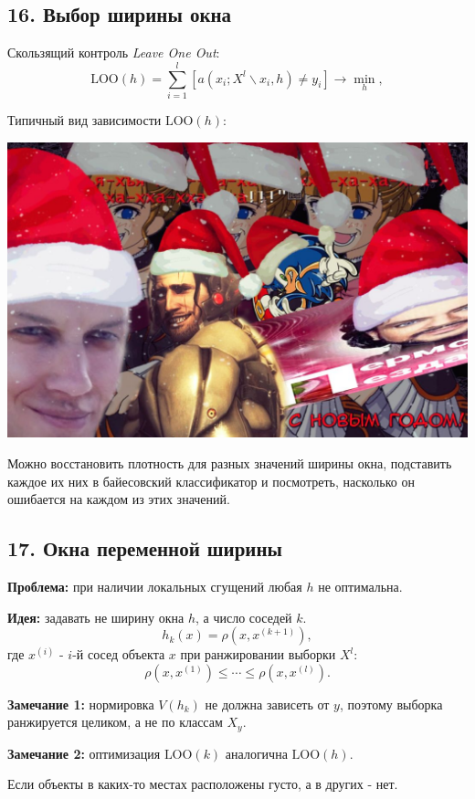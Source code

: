 \subsection{16. Выбор ширины окна}

Скользящий контроль \textit{Leave One Out}:
$$\text{LOO}{(h)} = \sum_{i=1}^{l}{\left[ a{(x_i; X^l \backslash x_i, h)} \neq y_i \right]} \rightarrow \min_{h},$$

Типичный вид зависимости $\text{LOO}{(h)}$:

\includegraphics[scale=0.3]{figures/samplefigure.jpg}

Можно восстановить плотность для разных значений ширины окна, подставить
каждое их них в байесовский классификатор и посмотреть, насколько он
ошибается на каждом из этих значений.

\subsection{17. Окна переменной ширины}

\textbf{Проблема:} при наличии локальных сгущений любая $h$ не оптимальна.

\textbf{Идея:} задавать не ширину окна $h$, а число соседей $k$.
$$h_k{(x)} = \rho{(x, x^{(k+1)})},$$
где $x^{(i)}$ - $i$-й сосед объекта $x$ при ранжировании выборки $X^l$:
$$\rho{(x, x^{(1)}) \leqslant \cdots \leqslant \rho{(x, x^{(l)})}.}$$

\textbf{Замечание 1:} нормировка $V{(h_k)}$ не должна зависеть от $y$, поэтому
выборка ранжируется целиком, а не по классам $X_y$.

\textbf{Замечание 2:} оптимизация $\text{LOO}{(k)}$ аналогична $\text{LOO}{(h)}$.

Если объекты в каких-то местах расположены густо, а в других - нет.

